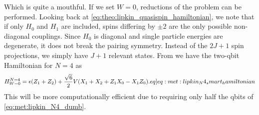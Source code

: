 Which is quite a mouthful. If we set $W = 0$, reductions of the problem can be performed. Looking back at \cref{eq:theo:lipkin_quasispin_hamiltonian}, we note that if only $H_0$ and $H_1$ are included,  spins differing by $\pm2$ are the only possible non-diagonal couplings. Since $H_0$ is diagonal and single particle energies are degenerate, it does not break the pairing symmetry. Instead of the $2J+1$ spin projections, we simply have $J+1$ relevant states. From \citep{hlatshwayoSimulatingExcitedStates2022} we have the two-qbit Hamiltonian for $N=4$ as
\begin{align}
    H_{W=0}^{N=4} = \epsilon(Z_1 + Z_2) + \frac{\sqrt{6}}{2}V (X_1 + X_2 + Z_1 X_0 - X_1 Z_0). \label[eq]{eq:met:lipkin_N4_smart_hamiltonian}
\end{align}
This will be more computationally efficient due to requiring only half the qbits of \cref{eq:met:lipkin_N4_dumb}. 

